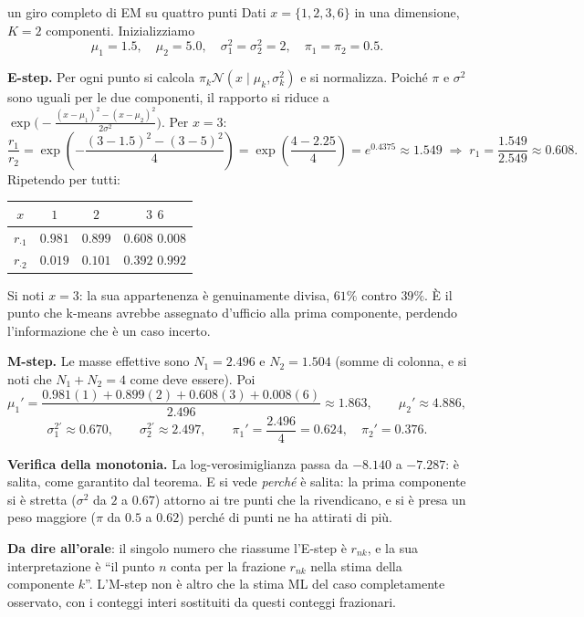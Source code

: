 \begin{esempiosvolto}{un giro completo di EM su quattro punti}
Dati $x = \{1, 2, 3, 6\}$ in una dimensione, $K = 2$ componenti. Inizializziamo
\[
\mu_1 = 1.5, \quad \mu_2 = 5.0, \quad \sigma_1^2 = \sigma_2^2 = 2, \quad \pi_1 = \pi_2 = 0.5.
\]

\medskip
\textbf{E-step.} Per ogni punto si calcola $\pi_k \mathcal{N}(x \mid \mu_k, \sigma_k^2)$ e si normalizza. Poiché $\pi$ e $\sigma^2$ sono uguali per le due componenti, il rapporto si riduce a $\exp\!\big(-\tfrac{(x-\mu_1)^2 - (x-\mu_2)^2}{2\sigma^2}\big)$. Per $x = 3$:
\[
\frac{r_1}{r_2} = \exp\!\left(-\frac{(3-1.5)^2 - (3-5)^2}{4}\right) = \exp\!\left(\frac{4 - 2.25}{4}\right) = e^{0.4375} \approx 1.549
\;\Rightarrow\; r_1 = \frac{1.549}{2.549} \approx 0.608.
\]
Ripetendo per tutti:
\begin{center}
\begin{tabular}{cccc}
\toprule
$x$ & $1$ & $2$ & $3$ \quad $6$ \\
\midrule
$r_{\cdot 1}$ & $0.981$ & $0.899$ & $0.608$ \quad $0.008$ \\
$r_{\cdot 2}$ & $0.019$ & $0.101$ & $0.392$ \quad $0.992$ \\
\bottomrule
\end{tabular}
\end{center}

Si noti $x = 3$: la sua appartenenza è genuinamente divisa, $61\%$ contro $39\%$. È il punto che k-means avrebbe assegnato d'ufficio alla prima componente, perdendo l'informazione che è un caso incerto.

\medskip
\textbf{M-step.} Le masse effettive sono $N_1 = 2.496$ e $N_2 = 1.504$ (somme di colonna, e si noti che $N_1 + N_2 = 4$ come deve essere). Poi
\[
\mu_1' = \frac{0.981(1) + 0.899(2) + 0.608(3) + 0.008(6)}{2.496} \approx 1.863, \qquad
\mu_2' \approx 4.886,
\]
\[
\sigma_1^{2\prime} \approx 0.670, \qquad \sigma_2^{2\prime} \approx 2.497, \qquad
\pi_1' = \frac{2.496}{4} = 0.624, \quad \pi_2' = 0.376.
\]

\medskip
\textbf{Verifica della monotonia.} La log-verosimiglianza passa da $-8.140$ a $-7.287$: è salita, come garantito dal teorema. E si vede \emph{perché} è salita: la prima componente si è stretta ($\sigma^2$ da $2$ a $0.67$) attorno ai tre punti che la rivendicano, e si è presa un peso maggiore ($\pi$ da $0.5$ a $0.62$) perché di punti ne ha attirati di più.

\textbf{Da dire all'orale}: il singolo numero che riassume l'E-step è $r_{nk}$, e la sua interpretazione è ``il punto $n$ conta per la frazione $r_{nk}$ nella stima della componente $k$''. L'M-step non è altro che la stima ML del caso completamente osservato, con i conteggi interi sostituiti da questi conteggi frazionari.
\end{esempiosvolto}

